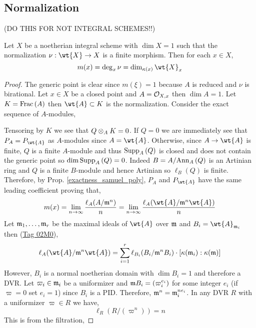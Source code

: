 \documentclass[12pt]{article}
\begin{document}
\subsection{Normalization}

(DO THIS FOR NOT INTEGRAL SCHEMES!!)

\begin{prop}
Let $X$ be a noetherian integral scheme with $\dim{X} = 1$ such that the normalization $\nu : \wt{X} \to X$ is a finite morphism. Then for each $x \in X$,
\[ m(x) = \deg_x{\nu} = \dim_{\kappa(x)} \wt{X}_x \]
\end{prop}

\begin{proof}
The generic point is clear since $m(\xi) = 1$ because $A$ is reduced and $\nu$ is birational. Let $x \in X$ be a closed point and $A = \mathcal{O}_{X, x}$ then $\dim{A} = 1$. Let $K = \mathrm{Frac}\left(A\right)$ then $\wt{A} \subset K$ is the normalization. Consider the exact sequence of $A$-modules,
\begin{center}
\end{center}
Tensoring by $K$ we see that $Q \otimes_A K = 0$. If $Q = 0$ we are immediately see that $P_A = P_{\wt{A}}$ as $A$-modules since $A = \wt{A}$. Otherwise, since $A \to \wt{A}$ is finite, $Q$ is a finite $A$-module and thus $\mathrm{Supp}_{A}\left(Q \right)$ is closed and does not contain the generic point so $\dim{\mathrm{Supp}_{A}\left(Q \right)} = 0$. Indeed $B = A / \mathrm{Ann}_{A}\left(Q\right)$ is an Artinian ring and $Q$ is a finite $B$-module and hence Artinian so $\ell_B(Q)$ is finite. Therefore, by Prop. \ref{exactness_samuel_poly}, $P_A$ and $P_{\wt{A}}$ have the same leading coefficient proving that,
\[ m(x) = \lim_{n \to \infty} \frac{\ell_A(A/\m^n)}{n} = \lim_{n \to \infty} \frac{\ell_A(\wt{A} / \m^n \wt{A})}{n} \]
Let $\mathfrak{m}_1, \dots, \mathfrak{m}_r$ be the maximal ideals of $\wt{A}$ over $\mathfrak{m}$ and $B_i = \wt{A}_{\m_i}$ then (\href{https://stacks.math.columbia.edu/tag/02M0}{Tag 02M0}),
\[ \ell_A(\wt{A} / \m^n \wt{A}) = \sum_{i = 1}^r \ell_{B_i}(B_i / \m^n B_i) \cdot [\kappa(\m_i) : \kappa(\m)]   \]
However, $B_i$ is a normal noetherian domain with $\dim{B_i} = 1$ and therefore a DVR. Let $\varpi_i \in \mathfrak{m}_i$ be a uniformizer and $\mathfrak{m} B_i = (\varpi_i^{e_i})$ for some integer $e_i$ (if $\varpi = 0$ set $e_i = 1$) since $B_i$ is a PID. Therefore, $\mathfrak{m}^n = \mathfrak{m}_i^{n e_i}$. In any DVR $R$ with a uniformizer $\varpi \in R$ we have,
\[ \ell_R(R/(\varpi^n)) = n \]
This is from the filtration,

\end{proof}
\end{document}

